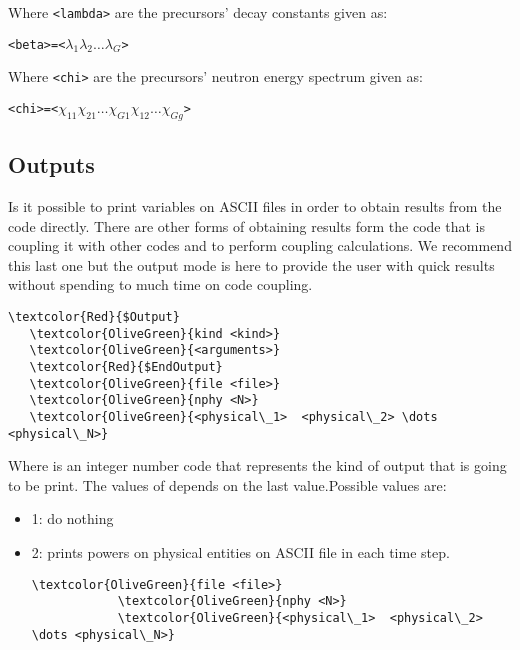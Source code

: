 \noindent
Where \verb|<lambda>| are the precursors' decay constants given as:

\begin{alltt}
   <beta> = < \(\lambda_{1}\) \(\lambda_{2} \dots \lambda_{G}\) >
\end{alltt}

\noindent
Where \verb|<chi>| are the precursors' neutron energy spectrum given as:

\begin{alltt}
   <chi> = < \(\chi_{11} \chi_{21} \dots \chi_{G1} \chi_{12} \dots \chi_{Gg}\) >
\end{alltt}


\subsection{Outputs}


Is it possible to print variables on ASCII files in order to obtain results from the code
directly. There are other forms of obtaining results form the code that is coupling it with
other codes and to perform coupling calculations. We recommend this last one but the output
mode is here to provide the user with quick results without spending to much time on code
coupling.

\begin{Verbatim}[frame=single,commandchars=\\\{\}]
   \textcolor{Red}{$Output}
   \textcolor{OliveGreen}{kind <kind>}
   \textcolor{OliveGreen}{<arguments>}
   \textcolor{Red}{$EndOutput}
   \textcolor{OliveGreen}{file <file>}
   \textcolor{OliveGreen}{nphy <N>}
   \textcolor{OliveGreen}{<physical\_1>  <physical\_2> \dots <physical\_N>}
\end{Verbatim}

Where \textalltt{\textcolor{OliveGreen}{<kind>}} is an integer number code that represents
the kind of output that is going to be print. The values of
\textalltt{\textcolor{OliveGreen}{<arguments>}} depends on the last value.Possible values
are:

\begin{itemize}
   \item 1: do nothing
   \item 2: prints powers on physical entities on ASCII file in each time step.
         \begin{Verbatim}[frame=single,commandchars=\\\{\}]
            \textcolor{OliveGreen}{file <file>}
            \textcolor{OliveGreen}{nphy <N>}
            \textcolor{OliveGreen}{<physical\_1>  <physical\_2> \dots <physical\_N>}
         \end{Verbatim}
\end{itemize}


